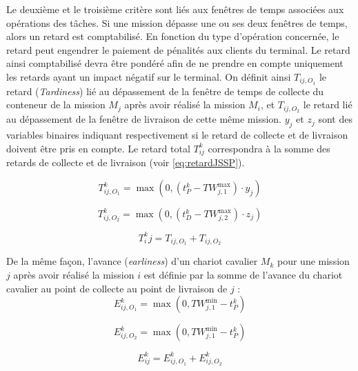 Le deuxième et le troisième critère sont liés aux fenêtres de temps associées aux opérations des tâches. Si une mission dépasse une ou ses deux fenêtres de temps, alors un retard est comptabilisé. En fonction du type d'opération concernée, le retard peut engendrer le paiement de pénalités aux clients du terminal. Le retard ainsi comptabilisé devra être pondéré afin de ne prendre en compte uniquement les retards ayant un impact négatif sur le terminal. On définit ainsi $T_{ij,O_1}$ le retard (\textit{Tardiness}) lié au dépassement de la fenêtre de temps de collecte du conteneur de la mission $M_j$ après avoir réalisé la mission $M_i$, et $T_{ij,O_2}$ le retard lié au dépassement de la fenêtre de livraison de cette même mission. $y_j$ et $z_j$ sont des variables binaires indiquant respectivement si le retard de collecte et de livraison doivent être pris en compte. Le retard total $T^k_{ij}$ correspondra à la somme des retards de collecte et de livraison (voir \ref{eq:retardJSSP}).

\begin{equation}
 \label{eq:retardPickupJSSP}
 T^k_{ij,O_1} = \max \left( 0 , (t^k_P - TW_{j,1}^{\max}) \cdot y_j \right)
\end{equation}

\begin{equation}
 \label{eq:retardDeliveryJSSP}
 T^k_{ij,O_2} = \max \left( 0 , (t^k_D - TW_{j,2}^{\max}) \cdot z_j \right)
\end{equation}

\begin{equation}
 \label{eq:retardJSSP}
 T^k_ij = T_{ij,O_1} + T_{ij,O_2}
\end{equation}

De la même façon, l'avance (\textit{earliness}) d'un chariot cavalier $M_k$ pour une mission $j$ après avoir réalisé la mission $i$ est définie par la somme de l'avance du chariot cavalier au point de collecte au point de livraison de $j$ : 
\begin{equation}
 \label{eq:earlinessPickupJSSP}
   E^{k}_{ij,O_1} = \max \left( 0 , TW_{j,1}^{\min} - t^k_P\right)
\end{equation}

\begin{equation}
 \label{eq:earlinessDeliveryJSSP}
   E^{k}_{ij,O_2} = \max \left( 0 , TW_{j,1}^{\min} - t^k_P\right)
\end{equation}

\begin{equation}
 \label{eq:earlinessJSSP}
   E^{k}_{ij} = E^{k}_{ij,O_1} + E^{k}_{ij,O_2}
\end{equation}
 
